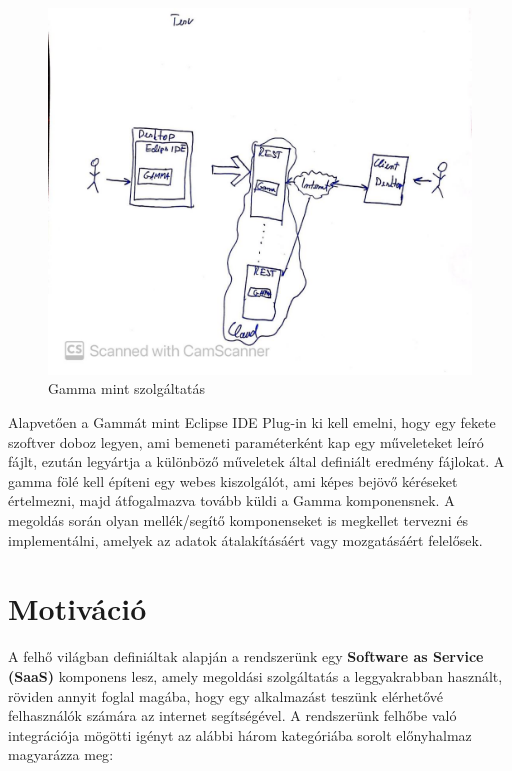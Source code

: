 \begin{figure}[t]
	\centering
	\includegraphics[width=150mm, keepaspectratio]{figures/transformation.jpg}
	\caption{Gamma mint szolgáltatás}
	\label{fig:transformation}
\end{figure}


Alapvetően a Gammát mint Eclipse IDE Plug-in ki kell emelni, hogy egy fekete szoftver doboz legyen, ami bemeneti paraméterként kap egy műveleteket leíró fájlt, ezután legyártja a különböző műveletek által definiált eredmény fájlokat. A gamma fölé kell építeni egy webes kiszolgálót, ami képes bejövő kéréseket értelmezni, majd átfogalmazva tovább küldi a Gamma komponensnek. A megoldás során olyan mellék/segítő komponenseket is megkellet tervezni és implementálni, amelyek az adatok átalakításáért vagy mozgatásáért felelősek.

\section{Motiváció}

A felhő világban definiáltak alapján a rendszerünk egy \textbf{Software as Service (SaaS)} komponens lesz, amely megoldási szolgáltatás a leggyakrabban használt, röviden annyit foglal magába, hogy egy alkalmazást teszünk elérhetővé felhasználók számára az internet segítségével.
A rendszerünk felhőbe való integrációja mögötti igényt az alábbi három kategóriába sorolt előnyhalmaz magyarázza meg\cite{top10}\cite{ibm}:

